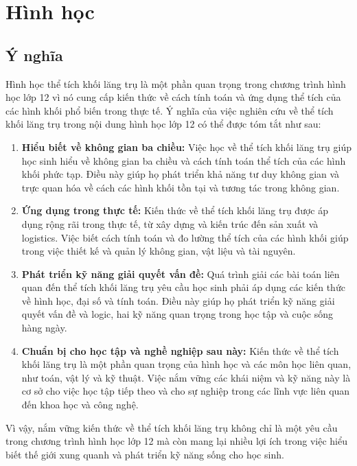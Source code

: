 \chapter{Hình học}
\section{Ý nghĩa}

Hình học thể tích khối lăng trụ là một phần quan trọng trong chương trình hình học lớp 12 vì nó cung cấp kiến thức về cách tính toán và ứng dụng thể tích của các hình khối phổ biến trong thực tế. Ý nghĩa của việc nghiên cứu về thể tích khối lăng trụ trong nội dung hình học lớp 12 có thể được tóm tắt như sau:

\begin{enumerate}
    \item \textbf{Hiểu biết về không gian ba chiều:} Việc học về thể tích khối lăng trụ giúp học sinh hiểu về không gian ba chiều và cách tính toán thể tích của các hình khối phức tạp. Điều này giúp họ phát triển khả năng tư duy không gian và trực quan hóa về cách các hình khối tồn tại và tương tác trong không gian.
    
    \item \textbf{Ứng dụng trong thực tế:} Kiến thức về thể tích khối lăng trụ được áp dụng rộng rãi trong thực tế, từ xây dựng và kiến trúc đến sản xuất và logistics. Việc biết cách tính toán và đo lường thể tích của các hình khối giúp trong việc thiết kế và quản lý không gian, vật liệu và tài nguyên.
    
    \item \textbf{Phát triển kỹ năng giải quyết vấn đề:} Quá trình giải các bài toán liên quan đến thể tích khối lăng trụ yêu cầu học sinh phải áp dụng các kiến thức về hình học, đại số và tính toán. Điều này giúp họ phát triển kỹ năng giải quyết vấn đề và logic, hai kỹ năng quan trọng trong học tập và cuộc sống hàng ngày.
    
    \item \textbf{Chuẩn bị cho học tập và nghề nghiệp sau này:} Kiến thức về thể tích khối lăng trụ là một phần quan trọng của hình học và các môn học liên quan, như toán, vật lý và kỹ thuật. Việc nắm vững các khái niệm và kỹ năng này là cơ sở cho việc học tập tiếp theo và cho sự nghiệp trong các lĩnh vực liên quan đến khoa học và công nghệ.
\end{enumerate}

Vì vậy, nắm vững kiến thức về thể tích khối lăng trụ không chỉ là một yêu cầu trong chương trình hình học lớp 12 mà còn mang lại nhiều lợi ích trong việc hiểu biết thế giới xung quanh và phát triển kỹ năng sống cho học sinh.


